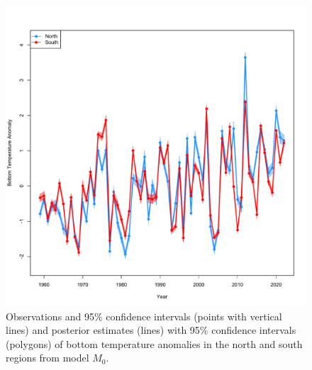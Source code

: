 \documentclass[
]{article}
\begin{document}
\begin{figure}

{\centering \includegraphics[width=1\linewidth]{Ecov} 

}

\caption{Observations and 95\% confidence intervals (points with vertical lines) and posterior estimates (lines) with 95\% confidence intervals (polygons) of bottom temperature anomalies in the north and south regions from model $M_0$.}\label{fig:bottom-temperature}
\end{figure}
\pagebreak
\end{document}
